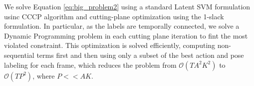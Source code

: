 \documentclass[10pt,letterpaper]{article}
\newcommand{\+}[1]{\ensuremath{{\boldsymbol #1}}}
\begin{document}
\vspace{0.3cm}
We solve Equation \ref{eq:big_problem2} using a standard Latent SVM formulation usinc CCCP algorithm and cutting-plane optimization using the 1-slack formulation. In particular, as the labels are temporally connected, we solve a Dynamic Programming problem in each cutting plane iteration to fint the most violated constraint. This optimization is solved efficiently, computing non-sequential terms first and then using only a subset of the best action and pose labeling for each frame, which reduces the problem from $\mathcal{O}(TA^2K^2)$ to $\mathcal{O}(TP^2)$, where  $P<<AK$.
\end{document}
